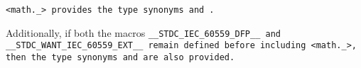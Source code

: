 \tt{<math._>} provides the type synonyms  and .

Additionally, if both the macros \tt{__STDC_IEC_60559_DFP__} and
\tt{__STDC_WANT_IEC_60559_EXT__} remain defined before including \tt{<math._>},
then the type synonyms  and  are also provided.
